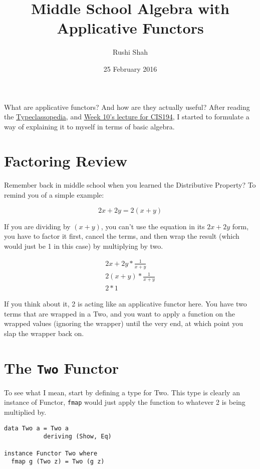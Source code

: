 \documentclass[12pt]{article}
\title{Middle School Algebra with Applicative Functors}
\author{Rushi Shah}
\date{25 February 2016}
\begin{document}
  \maketitle

  What are applicative functors? And how are they actually useful? After reading the \href{https://wiki.haskell.org/Typeclassopedia}{Typeclassopedia}, and \href{http://www.seas.upenn.edu/~cis194/spring13/lectures/10-applicative.html}{Week 10's lecture for CIS194}, I started to formulate a way of explaining it to myself in terms of basic algebra. 

  \section{Factoring Review}

  Remember back in middle school when you learned the Distributive Property? To remind you of a simple example: 

  \[2x + 2y = 2(x + y)\]

  If you are dividing by \((x + y)\), you can't use the equation in its \(2x + 2y\) form, you have to factor it first, cancel the terms, and then wrap the result (which would just be 1 in this case) by multiplying by two. 

  \begin{equation*}
    \begin{gathered}
    2x + 2y * \frac{1}{x + y} \\
    2(x + y) * \frac{1}{x + y} \\
    2 * 1
   \end{gathered}
  \end{equation*}

  If you think about it, 2 is acting like an applicative functor here. You have two terms that are wrapped in a Two, and you want to apply a function on the wrapped values (ignoring the wrapper) until the very end, at which point you slap the wrapper back on.

  \section{The \texttt{Two} Functor}

  To see what I mean, start by defining a type for Two. This type is clearly an instance of Functor, \texttt{fmap} would just apply the function to whatever 2 is being multiplied by. 
  \begin{verbatim}
data Two a = Two a
           deriving (Show, Eq)

instance Functor Two where
  fmap g (Two z) = Two (g z)
  \end{verbatim}
\end{document}
